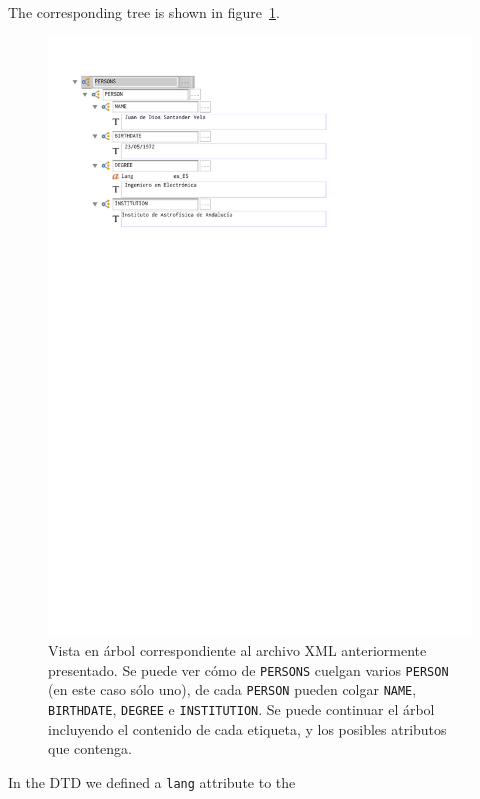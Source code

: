 {			The corresponding tree is shown in
			figure~\ref{fig:fig_persons}.

			\begin{figure}[tbp]
				\centering
					\includegraphics[width=\columnwidth]
					{fig/persons.pdf}
				\caption[Vista en árbol de un archivo XML]{
					Vista en árbol correspondiente al archivo XML
					anteriormente presentado. Se puede ver cómo de
					\texttt{PERSONS} cuelgan varios \texttt{PERSON}
					(en este caso sólo uno), de cada
					\texttt{PERSON} pueden colgar \texttt{NAME},
					\texttt{BIRTHDATE}, \texttt{DEGREE} e
					\texttt{INSTITUTION}. Se puede continuar el
					árbol incluyendo el contenido de cada etiqueta,
					y los posibles atributos que contenga.
			}
				\label{fig:fig_persons}
			\end{figure}
			
			In the DTD we defined a \texttt{lang} attribute to the 
			
}
